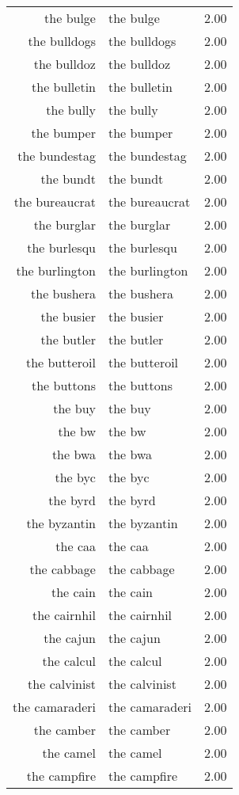 \begin{table}[ht]
\begin{tabular}{rlr}
  the bulge & the bulge & 2.00 \\ 
  the bulldogs & the bulldogs & 2.00 \\ 
  the bulldoz & the bulldoz & 2.00 \\ 
  the bulletin & the bulletin & 2.00 \\ 
  the bully & the bully & 2.00 \\ 
  the bumper & the bumper & 2.00 \\ 
  the bundestag & the bundestag & 2.00 \\ 
  the bundt & the bundt & 2.00 \\ 
  the bureaucrat & the bureaucrat & 2.00 \\ 
  the burglar & the burglar & 2.00 \\ 
  the burlesqu & the burlesqu & 2.00 \\ 
  the burlington & the burlington & 2.00 \\ 
  the bushera & the bushera & 2.00 \\ 
  the busier & the busier & 2.00 \\ 
  the butler & the butler & 2.00 \\ 
  the butteroil & the butteroil & 2.00 \\ 
  the buttons & the buttons & 2.00 \\ 
  the buy & the buy & 2.00 \\ 
  the bw & the bw & 2.00 \\ 
  the bwa & the bwa & 2.00 \\ 
  the byc & the byc & 2.00 \\ 
  the byrd & the byrd & 2.00 \\ 
  the byzantin & the byzantin & 2.00 \\ 
  the caa & the caa & 2.00 \\ 
  the cabbage & the cabbage & 2.00 \\ 
  the cain & the cain & 2.00 \\ 
  the cairnhil & the cairnhil & 2.00 \\ 
  the cajun & the cajun & 2.00 \\ 
  the calcul & the calcul & 2.00 \\ 
  the calvinist & the calvinist & 2.00 \\ 
  the camaraderi & the camaraderi & 2.00 \\ 
  the camber & the camber & 2.00 \\ 
  the camel & the camel & 2.00 \\ 
  the campfire & the campfire & 2.00 \\ 

\end{tabular}
\end{table}
